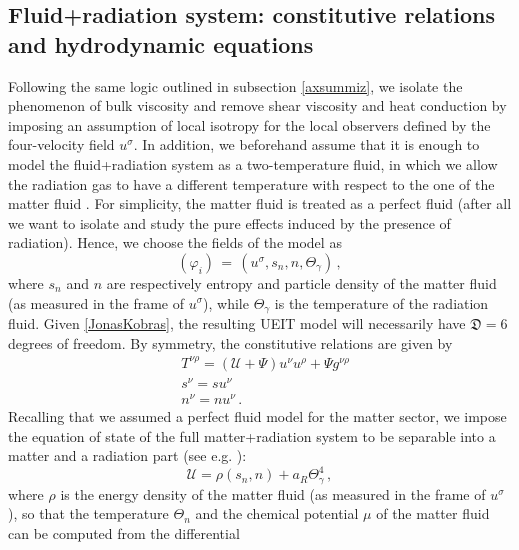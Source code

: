 \documentclass[a4paper, amsfonts, amssymb, amsmath, reprint, twocolumn, showkeys, nofootinbib]{revtex4-2}
\begin{document}
\subsection{Fluid+radiation system: constitutive relations and hydrodynamic equations}

Following the same logic outlined in subsection \ref{axsummiz}, we isolate the phenomenon of bulk viscosity and remove shear viscosity and heat conduction by imposing an assumption of local isotropy for the  local observers defined by the four-velocity field $u^\sigma$. In addition, we beforehand   assume that it is enough to model the fluid+radiation system as a two-temperature fluid, in which we allow the radiation gas to have a different temperature with respect to the one of the matter fluid \citep{UdeyIsrael1982}. For simplicity, the matter fluid is treated as a perfect fluid (after all  we want to isolate and study the pure effects induced by the presence of radiation). 
Hence, we choose the fields of the  model as
\begin{equation}
\label{JonasKobras}
(\varphi_i) \,  = \, (u^\sigma,s_n,n,\Theta_\gamma) \,  ,
\end{equation}
where $s_n$ and $n$ are respectively entropy and particle density of the matter fluid (as measured in the frame of $u^\sigma$), while $\Theta_\gamma$ is the temperature of the radiation fluid. 
Given \eqref{JonasKobras}, the resulting UEIT model will necessarily have $\mathfrak{D}=6$ degrees of freedom. By symmetry, the constitutive relations are given by
\begin{equation}
\label{RRad}
\begin{split}
 & T^{\nu \rho} = (\mathcal{U} +\Psi)u^\nu u^\rho + \Psi g^{\nu \rho} \\
 & s^\nu = s u^\nu \\
 & n^\nu = n u^\nu  \, .
\end{split}
\end{equation}
Recalling that we assumed a perfect fluid model for the matter sector, we impose the equation of state of the full matter+radiation system to be separable into a matter and a radiation part  (see e.g. \citep{mihalas_book,rezzolla_book}):
\begin{equation}\label{Uradiuz}
\mathcal{U} = \rho(s_n,n) + a_R \Theta_\gamma^4 \, ,
\end{equation}
where $\rho$ is the energy density of the matter fluid (as measured in the frame of $u^\sigma$), so that 
the temperature $\Theta_n$ and the chemical potential $\mu$ of the matter fluid can be computed from the differential
\end{document}

